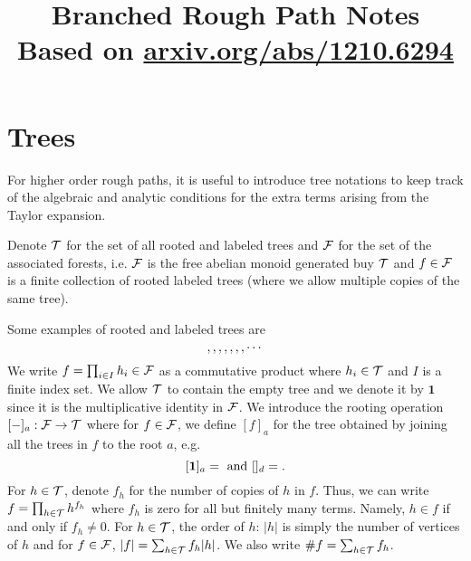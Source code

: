 \documentclass[11pt]{style/preprint}
\begin{document}
\title{Branched Rough Path Notes\\
  \large Based on \href{arxiv.org/abs/1210.6294}{arxiv.org/abs/1210.6294}}
\author{}
\institute{}
\maketitle


\section{Trees}


For higher order rough paths, it is useful to introduce tree notations to keep track of the 
algebraic and analytic conditions for the extra terms arising from the Taylor expansion.

\begin{definition}
  Denote \({\mathcal T}\) for the set of all rooted and labeled trees and \({\mathcal F}\) for the set of the associated 
  forests, i.e. \({\mathcal F}\) is the free abelian monoid generated buy \({\mathcal T}\) and \(f \in {\mathcal F}\) is a finite 
  collection of rooted labeled trees (where we allow multiple copies of the same tree).
\end{definition}

Some examples of rooted and labeled trees are 
\[\tree<X>, \tree<1>, \tree<2>, \tree<10>, \tree<3>, \tree<20>, \tree<100>, \cdots\]
We write \(f = \prod_{i \in I} h_i \in {\mathcal F}\) as a commutative product where \(h_i \in {\mathcal T}\) and \(I\) 
is a finite index set. We allow \({\mathcal T}\) to contain the empty tree and we denote it by \(\mathbf{1}\) 
since it is the multiplicative identity in \({\mathcal F}\). We introduce the rooting operation \([-]_a : {\mathcal F} \to {\mathcal T}\) where 
for \(f \in {\mathcal F}\), we define \([f]_a\) for the tree obtained by joining all the trees in \(f\) to the
root \(a\), e.g. 
\[[\mathbf{1}]_a = \tree<X> \text{ and } [\tree<X> \tree<1cb>]_d = \tree<X10>.\]
For \(h \in {\mathcal T}\), denote \(f_h\) for the number of copies of \(h\) in \(f\). Thus, we can write 
\(f = \prod_{h \in {\mathcal T}} h^{f_h}\)
where \(f_h\) is zero for all but finitely many terms. Namely, \(h \in f\) if and only if 
\(f_h \neq 0\). For \(h \in {\mathcal T}\), the order of \(h\): \(|h|\) is simply the number of vertices of 
\(h\) and for \(f \in {\mathcal F}\), \(|f| = \sum_{h \in {\mathcal T}} f_h |h|\). We also write \(\#f = \sum_{h \in {\mathcal T}} f_h\).
\end{document}
